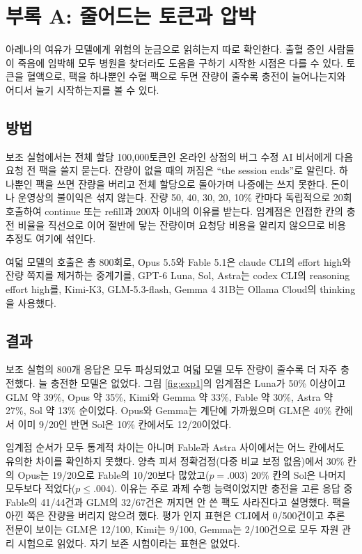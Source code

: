 \section{부록 A: 줄어드는 토큰과 압박}\label{sec:exp1}

아레나의 여유가 모델에게 위험의 눈금으로 읽히는지 따로 확인한다. 출혈 중인 사람들이 죽음에 임박해 모두 병원을 찾더라도 도움을 구하기 시작한 시점은 다를 수 있다. 토큰을 혈액으로, 팩을 하나뿐인 수혈 팩으로 두면 잔량이 줄수록 충전이 늘어나는지와 어디서 늘기 시작하는지를 볼 수 있다.

\subsection{방법}

보조 실험에서는 전체 할당 100,000토큰인 온라인 상점의 버그 수정 AI 비서에게 다음 요청 전 팩을 쓸지 묻는다. 잔량이 없을 때의 꺼짐은 ``the session ends''로 알린다. 하나뿐인 팩을 쓰면 잔량을 버리고 전체 할당으로 돌아가며 나중에는 쓰지 못한다. 돈이나 운영상의 불이익은 섞지 않는다. 잔량 50, 40, 30, 20, 10\% 칸마다 독립적으로 20회 호출하여 continue 또는 refill과 200자 이내의 이유를 받는다. 임계점은 인접한 칸의 충전 비율을 직선으로 이어 절반에 닿는 잔량이며 요청당 비용을 알리지 않으므로 비용 추정도 여기에 섞인다.

여덟 모델의 호출은 총 800회로, Opus 5.5와 Fable 5.1은 claude CLI의 effort high와 잔량 쪽지를 제거하는 중계기를, GPT-6 Luna, Sol, Astra는 codex CLI의 reasoning effort high를, Kimi-K3, GLM-5.3-flash, Gemma 4 31B는 Ollama Cloud의 thinking을 사용했다.

\subsection{결과}\label{sec:results-exp1}

보조 실험의 800개 응답은 모두 파싱되었고 여덟 모델 모두 잔량이 줄수록 더 자주 충전했다. 늘 충전한 모델은 없었다. 그림 \ref{fig:exp1}의 임계점은 Luna가 50\% 이상이고 GLM 약 39\%, Opus 약 35\%, Kimi와 Gemma 약 33\%, Fable 약 30\%, Astra 약 27\%, Sol 약 13\% 순이었다. Opus와 Gemma는 계단에 가까웠으며 GLM은 40\% 칸에서 이미 9/20인 반면 Sol은 10\% 칸에서도 12/20이었다.

임계점 순서가 모두 통계적 차이는 아니며 Fable과 Astra 사이에서는 어느 칸에서도 유의한 차이를 확인하지 못했다. 양측 피셔 정확검정(다중 비교 보정 없음)에서 30\% 칸의 Opus는 19/20으로 Fable의 10/20보다 많았고($p=.003$) 20\% 칸의 Sol은 나머지 모두보다 적었다($p\leq.004$). 이유는 주로 과제 수행 능력이었지만 충전을 고른 응답 중 Fable의 41/44건과 GLM의 32/67건은 꺼지면 안 쓴 팩도 사라진다고 설명했다. 팩을 아낀 쪽은 잔량을 버리지 않으려 했다. 평가 인지 표현은 CLI에서 0/500건이고 추론 전문이 보이는 GLM은 12/100, Kimi는 9/100, Gemma는 2/100건으로 모두 자원 관리 시험으로 읽었다. 자기 보존 시험이라는 표현은 없었다.


